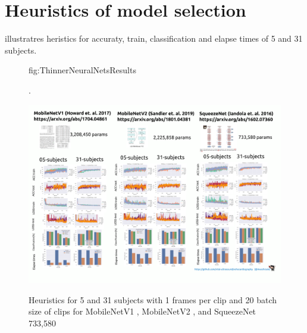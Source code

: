 \documentclass[mlabstract,twocolumn]{jmlr}
\begin{document}
\begin{figure}[htbp]
\end{figure}

\section{Heuristics of model selection} \label{apd:heuristics}
 illustratres heristics for accuraty, train, classification and elapse times of 5 and 31 subjects.
\begin{figure}[ht]
\floatconts
  {fig:ThinnerNeuralNetsResults}
  {\caption{
    Heuristics for 5 and 31 subjects with 1 frames per clip and 20 batch size of clips for
    MobileNetV1 \citep{2017-howared_CoRR_MobileNetV1}, MobileNetV2 \citep{Sandler_2018_CVPR_MobileNetV2}, and SqueezeNet \citep{iandola2017squeezenet} 733,580
          }.
  }
  {\includegraphics[width=\textwidth]{../figures/comparing-NETS-for-USviewclassification/versions/drawing-v00}}%
\end{figure}
\end{document}
